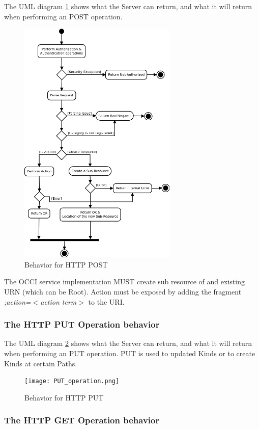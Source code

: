 \documentclass[10pt,a4paper]{article}
\begin{document}
The UML diagram \ref{fig:post_operation} shows what the Server can return, and what it will return when performing an POST operation.

\begin{figure}[!hp]
	\centering
	\includegraphics[scale=0.4]{POST_operation.png}
	\caption{Behavior for HTTP POST}
	\label{fig:post_operation}
\end{figure}

The OCCI service implementation MUST create sub resource of and existing URN (which can be Root). Action must be exposed by adding the fragment \emph{;action=$<$action term$>$} to the URI.

\newpage
\subsubsection{The HTTP PUT Operation behavior}

The UML diagram \ref{fig:put_operation} shows what the Server can return, and what it will return when performing an PUT operation. PUT is used to updated Kinds or to create Kinds at certain Paths.

\begin{figure}[!h]
	\centering
	\texttt{[image: PUT\_operation.png]}
	\caption{Behavior for HTTP PUT}
	\label{fig:put_operation}
\end{figure}

\newpage
\subsubsection{The HTTP GET Operation behavior}
\end{document}

